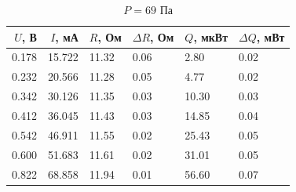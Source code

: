 \begin{table}[H]
\centering
\caption{$P = 69$ Па}
\begin{tabular}{rrllll}
\hline
 $U$, В &  $I$, мА &     $R$, Ом & $\Delta R$, Ом &     $Q$, мкВт & $\Delta Q$, мВт \\ \hline
0.178 & 15.722 & 11.32 &           0.06 &  2.80 &            0.02 \\ \hline
0.232 & 20.566 & 11.28 &           0.05 &  4.77 &            0.02 \\ \hline
0.342 & 30.126 & 11.35 &           0.03 & 10.30 &            0.03 \\ \hline
0.412 & 36.045 & 11.43 &           0.03 & 14.85 &            0.04 \\ \hline
0.542 & 46.911 & 11.55 &           0.02 & 25.43 &            0.05 \\ \hline
0.600 & 51.683 & 11.61 &           0.02 & 31.01 &            0.05 \\ \hline
0.822 & 68.858 & 11.94 &           0.01 & 56.60 &            0.07 \\ \hline
\end{tabular}
\end{table}
